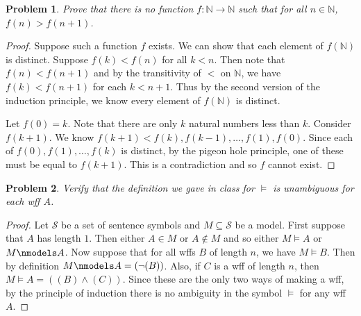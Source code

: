 \documentclass{article}
\newtheorem{problem}{Problem}
\begin{document}
\begin{problem}
Prove that there is no function $f : \mathbb{N} \to \mathbb{N}$ such that for all $n \in \mathbb{N}$, $f(n) > f(n+1)$.
\end{problem}
\begin{proof}
Suppose such a function $f$ exists. We can show that each element of $f(\mathbb{N})$ is distinct. Suppose $f(k) < f(n)$ for all $k < n$. Then note that $f(n) < f(n+1)$ and by the transitivity of $<$ on $\mathbb{N}$, we have $f(k) < f(n+1)$ for each $k < n+1$. Thus by the second version of the induction principle, we know every element of $f(\mathbb{N})$ is distinct.

Let $f(0) = k$. Note that there are only $k$ natural numbers less than $k$. Consider $f(k+1)$. We know $f(k+1) < f(k), f(k-1), \dots , f(1), f(0)$. Since each of $f(0), f(1), \dots , f(k)$ is distinct, by the pigeon hole principle, one of these must be equal to $f(k+1)$. This is a contradiction and so $f$ cannot exist.
\end{proof}

\begin{problem}
Verify that the definition we gave in class for $\models$ is unambiguous for each wff $A$.
\end{problem}
\begin{proof}
Let $\mathcal{S}$ be a set of sentence symbols and $M \subseteq \mathcal{S}$ be a model. First suppose that $A$ has length $1$. Then either $A \in M$ or $A \notin M$ and so either $M \models A$ or $M \nmodels A$. Now suppose that for all wffs $B$ of length $n$, we have $M \models B$. Then by definition $M \nmodels A = (\neg (B))$. Also, if $C$ is a wff of length $n$, then $M \models A = ((B) \wedge (C))$. Since these are the only two ways of making a wff, by the principle of induction there is no ambiguity in the symbol $\models$ for any wff $A$.
\end{proof}
\end{document}
